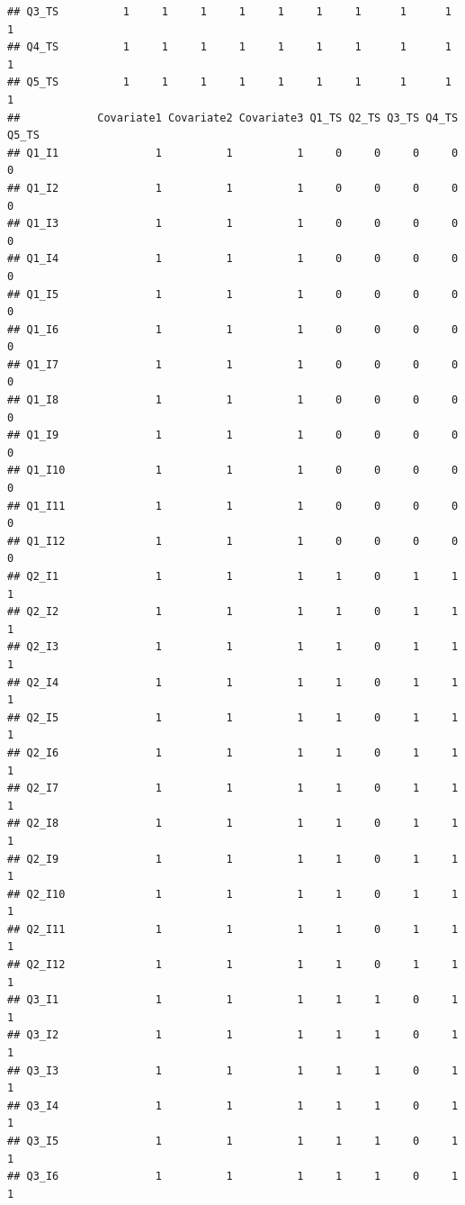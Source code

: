 \documentclass[]{book}
\begin{document}
\begin{verbatim}
## Q3_TS          1     1     1     1     1     1     1      1      1      1
## Q4_TS          1     1     1     1     1     1     1      1      1      1
## Q5_TS          1     1     1     1     1     1     1      1      1      1
##            Covariate1 Covariate2 Covariate3 Q1_TS Q2_TS Q3_TS Q4_TS Q5_TS
## Q1_I1               1          1          1     0     0     0     0     0
## Q1_I2               1          1          1     0     0     0     0     0
## Q1_I3               1          1          1     0     0     0     0     0
## Q1_I4               1          1          1     0     0     0     0     0
## Q1_I5               1          1          1     0     0     0     0     0
## Q1_I6               1          1          1     0     0     0     0     0
## Q1_I7               1          1          1     0     0     0     0     0
## Q1_I8               1          1          1     0     0     0     0     0
## Q1_I9               1          1          1     0     0     0     0     0
## Q1_I10              1          1          1     0     0     0     0     0
## Q1_I11              1          1          1     0     0     0     0     0
## Q1_I12              1          1          1     0     0     0     0     0
## Q2_I1               1          1          1     1     0     1     1     1
## Q2_I2               1          1          1     1     0     1     1     1
## Q2_I3               1          1          1     1     0     1     1     1
## Q2_I4               1          1          1     1     0     1     1     1
## Q2_I5               1          1          1     1     0     1     1     1
## Q2_I6               1          1          1     1     0     1     1     1
## Q2_I7               1          1          1     1     0     1     1     1
## Q2_I8               1          1          1     1     0     1     1     1
## Q2_I9               1          1          1     1     0     1     1     1
## Q2_I10              1          1          1     1     0     1     1     1
## Q2_I11              1          1          1     1     0     1     1     1
## Q2_I12              1          1          1     1     0     1     1     1
## Q3_I1               1          1          1     1     1     0     1     1
## Q3_I2               1          1          1     1     1     0     1     1
## Q3_I3               1          1          1     1     1     0     1     1
## Q3_I4               1          1          1     1     1     0     1     1
## Q3_I5               1          1          1     1     1     0     1     1
## Q3_I6               1          1          1     1     1     0     1     1

\end{verbatim}
\end{document}
